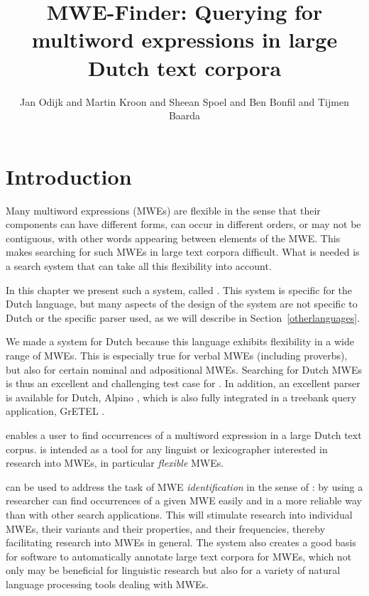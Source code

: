 \documentclass[output=paper,colorlinks,citecolor=brown]{langscibook}
\author{Jan Odijk\orcid{}\affiliation{Utrecht University} and
    Martin Kroon\orcid{}\affiliation{Utrecht University; Leiden University} and
    Sheean Spoel\orcid{}\affiliation{Utrecht University} and
    Ben Bonfil\orcid{}\affiliation{Utrecht University} and 
    Tijmen Baarda\orcid{}\affiliation{Utrecht University}}
\title[MWE-Finder]{MWE-Finder: Querying for multiword expressions in large Dutch text corpora}
\begin{document}
\judgewidth{\#}
\maketitle

\section{Introduction}
\label{introduction}

Many  multiword expressions (MWEs) are flexible in the sense that their components can have different forms, can occur in different orders, or may not be contiguous, with other words appearing between elements of the MWE.  This makes searching for such MWEs in large text corpora difficult. What is needed is a search system that can take all this flexibility into account. 

In this chapter we present such a system, called {\mwefinder}. This system is specific for the Dutch language, but many aspects of the design of the system are not specific to Dutch or the specific parser used, as we will describe in Section~\ref{otherlanguages}.

We made a system for  Dutch because this language exhibits flexibility in a wide range of MWEs. This is especially true for verbal MWEs (including proverbs), but also for certain nominal and adpositional MWEs. Searching for Dutch MWEs is thus an excellent and challenging test case for {\mwefinder}. In addition, an excellent parser is available for Dutch, Alpino \citep{VanNoord:2006}, which is also fully integrated in a treebank query application, GrETEL \citep{Augustinusetal:GrETEL:2017}.

{\mwefinder} enables a user to find occurrences of a multiword expression in a large Dutch  text corpus. {\mwefinder} is intended as a tool for any linguist or lexicographer interested in research into MWEs, in particular  \textit{flexible} MWEs.

{\mwefinder} can be used to address the task of MWE \textit{identification} in the sense of \citet{constant-etal-2017-survey}: by using {\mwefinder} a researcher can find occurrences of a given MWE easily and in a more reliable way than with other search applications. This will stimulate research into individual MWEs, their variants and their properties, and their frequencies, thereby facilitating research into MWEs in general.
The system also creates a good basis for software to automatically annotate large text corpora for MWEs, which not only may be beneficial for linguistic research but also for a variety of natural language processing tools dealing with MWEs. 
\end{document}

